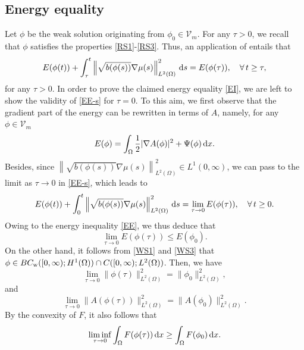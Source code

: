 \documentclass[11pt,reqno]{amsart}
\theoremstyle{remark}
\def\d{{\rm d}}
\numberwithin{equation}{section}
\def\d{{\rm d}}
\begin{document}
\subsection{Energy equality} Let $\phi$ be the weak solution originating from $\phi_0 \in \mathcal{V}_m$. For any $\tau>0$, we recall that $\phi$ satisfies the properties \eqref{RS1}-\eqref{RS3}. Thus, an application of \cite[Lemma 2.6]{SP2013} entails that
\begin{equation}
\label{EE-s}
E(\phi(t))+ \int_\tau^t
\left\| \sqrt{b(\phi(s))} \nabla \mu(s)\right\|_{L^2(\Omega)}^2 \, \d s =  E (\phi(\tau)), \quad \forall \, t \geq \tau,
\end{equation}
for any $\tau>0$. In order to prove the claimed energy equality \eqref{EI}, we are left to show the validity of \eqref{EE-s} for $\tau=0$.
To this aim, we first observe that the gradient part of the energy can be rewritten in terms of $A$, namely, for any $\phi\in \mathcal{V}_m$
\begin{equation}
\label{LSC-4}
E(\phi) = \int_\Omega \frac{1}{2} |\nabla A(\phi)|^2 + \Psi(\phi) \,\d x.
\end{equation}
Besides, since $\left\| \sqrt{b(\phi(s))} \nabla \mu(s)\right\|_{L^2(\Omega)}^2 \in L^1(0,\infty)$, we can pass to the limit as $\tau \to 0$ in \eqref{EE-s},
which leads to
\begin{equation}
\label{EE-s-2}
E(\phi(t))+ \int_0^t
\left\| \sqrt{b(\phi(s))} \nabla \mu(s)\right\|_{L^2(\Omega)}^2 \, \d s = \lim_{\tau \to 0}  E (\phi(\tau)), \quad \forall \, t \geq 0.
\end{equation}
Owing to the energy inequality \eqref{EE}, we thus deduce that
\begin{equation}
\label{EE-s-3}
\lim_{\tau \to 0}  E (\phi(\tau)) \leq E(\phi_0).
\end{equation}
On the other hand, it follows from \eqref{WS1} and \eqref{WS3}
that $\phi \in BC_{\rm w}([0,\infty); H^1(\Omega)) \cap C([0,\infty); L^2(\Omega))$. Then, we have
\begin{equation}
\label{LSC-1}
\lim_{\tau \to 0} \| \phi(\tau)\|_{L^2(\Omega)}^2
= \| \phi_0\|_{L^2(\Omega)}^2,
\end{equation}
and
\begin{equation}
\label{LSC-1bis}
\lim_{\tau \to 0} \| A(\phi(\tau)) \|_{L^2(\Omega)}^2
= \| A(\phi_0) \|_{L^2(\Omega)}^2.
\end{equation}
By the convexity of $F$, it also follows that
\begin{equation}
\label{LSC-2}
\liminf_{\tau \to 0} \int_{\Omega} F(\phi(\tau)) \, \d x\geq \int_{\Omega} F(\phi_0) \, \d x.
\end{equation}
\end{document}
